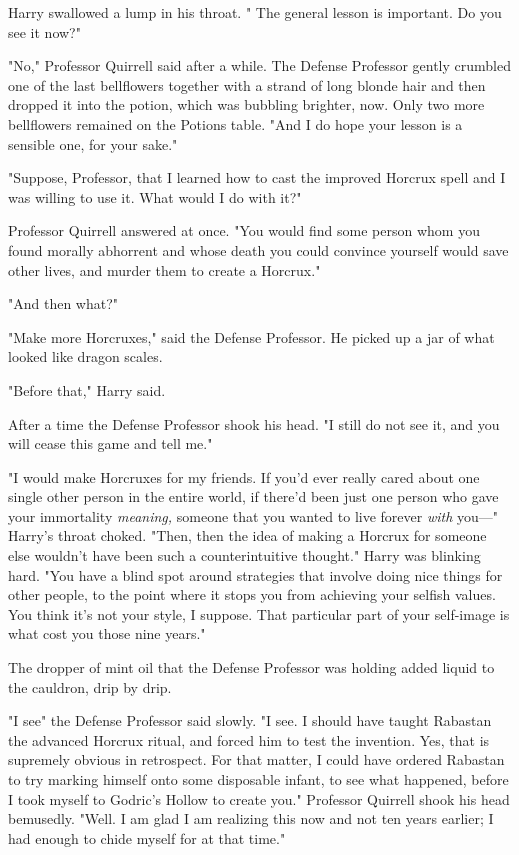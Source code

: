 Harry swallowed a lump in his throat. " The general lesson is important. Do you
see it now?"

"No," Professor Quirrell said after a while. The Defense Professor gently
crumbled one of the last bellflowers together with a strand of long blonde hair
and then dropped it into the potion, which was bubbling brighter, now. Only two
more bellflowers remained on the Potions table. "And I do hope your lesson is a
sensible one, for your sake."

"Suppose, Professor, that I learned how to cast the improved Horcrux spell and
I was willing to use it. What would I do with it?"

Professor Quirrell answered at once. "You would find some person whom you found
morally abhorrent and whose death you could convince yourself would save other
lives, and murder them to create a Horcrux."

"And then what?"

"Make more Horcruxes," said the Defense Professor. He picked up a jar of what
looked like dragon scales.

"Before that," Harry said.

After a time the Defense Professor shook his head. "I still do not see it, and
you will cease this game and tell me."

"I would make Horcruxes for my friends. If you'd ever really cared about one
single other person in the entire world, if there'd been just one person who
gave your immortality \emph{meaning,} someone that you wanted to live forever
\emph{with} you\mbox{---}" Harry's throat choked. "Then, then the idea of making a
Horcrux for someone else wouldn't have been such a counterintuitive thought."
Harry was blinking hard. "You have a blind spot around strategies that involve
doing nice things for other people, to the point where it stops you from
achieving your selfish values. You think{\el} it's not your style, I
suppose. That{\el} particular part of your self-image{\el} is what cost
you those nine years."

The dropper of mint oil that the Defense Professor was holding added liquid to
the cauldron, drip by drip.

"I see{\el}" the Defense Professor said slowly. "I see. I should have taught
Rabastan the advanced Horcrux ritual, and forced him to test the invention.
Yes, that is supremely obvious in retrospect. For that matter, I could have
ordered Rabastan to try marking himself onto some disposable infant, to see
what happened, before I took myself to Godric's Hollow to create you."
Professor Quirrell shook his head bemusedly. "Well. I am glad I am realizing
this now and not ten years earlier; I had enough to chide myself for at that
time."

